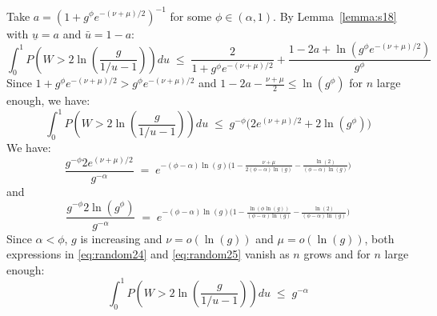 \documentclass[aos]{imsart}
\theoremstyle{plain}
\begin{document}
\begin{supplement}
Take $a=\left(1+g^{\phi}e^{-(\nu+\mu)/ 2}\right)^{-1}$ for some $\phi\in(\alpha,1)$. By Lemma~\ref{lemma:s18} with $\underline{u}=a$ and $\bar{u}=1-a$:
$$
\int_0^1 P\left(W>2 \ln \left(\frac{g}{1 / u-1}\right)\right) d u \;\leq\; \frac{2}{1+g^{\phi}e^{-(\nu+\mu)/2}}+ 
\frac{1-2a+\ln(g^{\phi}e^{-(\nu+\mu)/2})}{g^{\phi}} $$
Since $1+g^{\phi}e^{-(\nu+\mu)/ 2}>g^{\phi}e^{-(\nu+\mu)/ 2}$ and $1-2a-\frac{\nu+\mu}{2}\leq \ln(g^\phi)$ for $n$ large enough, we have:
$$
\int_0^1 P\left(W>2 \ln \left(\frac{g}{1 / u-1}\right)\right) d u \;\leq\; g^{-\phi}\big(2e^{(\nu+\mu)/ 2}+2\ln(g^{\phi})\big) $$
We have:
\begin{equation}\label{eq:random24}
    \frac{g^{-\phi}2e^{(\nu+\mu)/ 2}}{g^{-\alpha}} \;=\;e^{-(\phi-\alpha)\ln(g)\big(1-\frac{\nu+\mu}{2(\phi-\alpha)\ln(g)}- \frac{\ln(2)}{(\phi-\alpha)\ln(g)}\big)}
\end{equation}
and 
\begin{equation}\label{eq:random25}
    \frac{g^{-\phi}2\ln(g^{\phi})}{g^{-\alpha}} \;=\;e^{-(\phi-\alpha)\ln(g)\big(1-\frac{\ln(\phi\ln(g))}{(\phi-\alpha)\ln(g)}- \frac{\ln(2)}{(\phi-\alpha)\ln(g)}\big)}
\end{equation}
Since $\alpha<\phi$, $g$ is increasing and $\nu=o(\ln(g))$ and $\mu=o(\ln(g))$, both expressions in \eqref{eq:random24} and \eqref{eq:random25} vanish as $n$ grows and for $n$ large enough:
$$
\int_0^1 P\left(W>2 \ln \left(\frac{g}{1 / u-1}\right)\right) d u \;\leq\; g^{-\alpha}$$


\end{supplement}
\end{document}
